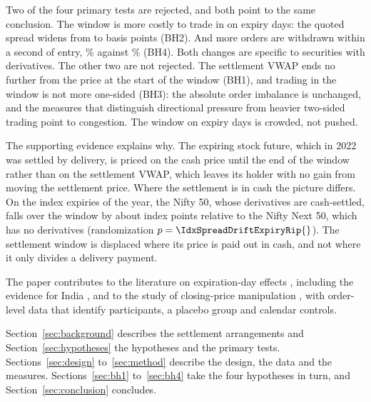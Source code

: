 Two of the four primary tests are rejected, and both point to the same conclusion. The window is
more costly to trade in on expiry days: the quoted spread widens from \SpreadMeanBpsControl{} to
\SpreadMeanBpsExpiry{} basis points (BH2). And more orders are withdrawn within a second of entry,
\LifePhantomRateExpiry{}\% against \LifePhantomRateControl{}\% (BH4). Both changes are specific to
securities with derivatives. The other two are not rejected. The settlement VWAP ends no further
from the price at the start of the window (BH1), and trading in the window is not more one-sided
(BH3): the absolute order imbalance is unchanged, and the measures that distinguish directional
pressure from heavier two-sided trading point to congestion. The window on expiry days is
crowded, not pushed.

The supporting evidence explains why. The expiring stock future, which in 2022 was settled by
delivery, is priced on the cash price until the end of the window rather than on the settlement
VWAP, which leaves its holder with no gain from moving the settlement price. Where the settlement
is in cash the picture differs. On the \IdxExpiries{} index expiries of the year, the Nifty 50,
whose derivatives are cash-settled, falls over the window by about \IdxSpreadDriftPoints{} index
points relative to the Nifty Next 50, which has no derivatives (randomization
$p = \IdxSpreadDriftExpiryRip{}$). The settlement window is displaced where its price is paid out
in cash, and not where it only divides a delivery payment.

The paper contributes to the literature on expiration-day effects \citep{stoll1987program,
stoll1991expiration}, including the evidence for India \citep{vipul2005futures,
agarwalla2013expiration}, and to the study of closing-price manipulation \citep{carhart2002leaning,
hillion2004price, comerton2011measuring}, with order-level data that identify participants,
a placebo group and calendar controls.

Section~\ref{sec:background} describes the settlement arrangements and
Section~\ref{sec:hypotheses} the hypotheses and the primary tests. Sections~\ref{sec:design}
to~\ref{sec:method} describe the design, the data and the measures.
Sections~\ref{sec:bh1} to~\ref{sec:bh4} take the four hypotheses in turn, and
Section~\ref{sec:conclusion} concludes.
